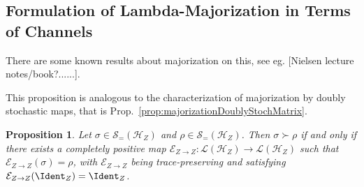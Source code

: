 \documentclass[11pt,a4paper]{article}
\theoremstyle{plain}
\newtheorem{prop}[thm]{Proposition}
\def\Hs{\mathscr{H}}%
\newcommand{\LOps}{\mathscr{L}}
\newcommand{\DOps}{\mathscr{S}_=}
\begin{document}
\subsection{Formulation of Lambda-Majorization in Terms of Channels}

There are some known results about majorization on this, see eg. [Nielsen lecture notes/book?......].

This proposition is analogous to the characterization of majorization by doubly stochastic maps, that
is Prop.~\ref{prop:majorizationDoublyStochMatrix}.
\begin{prop}
  \label{prop:MajorizationUnitalCPM}
  Let $\sigma\in\DOps(\Hs_Z)$ and $\rho\in\DOps(\Hs_Z)$. Then $\sigma\succ\rho$ if and only if
  there exists a completely positive map $\mathcal{E}_{Z\rightarrow Z} : \LOps(\Hs_Z)\rightarrow\LOps(\Hs_Z)$
  such that $\mathcal{E}_{Z\rightarrow Z}(\sigma) = \rho$, with $\mathcal{E}_{Z\rightarrow Z}$ being
  trace-preserving and satisfying $\mathcal{E}_{Z\rightarrow Z}(\Ident_Z) = \Ident_Z$.
\end{prop}
\end{document}
